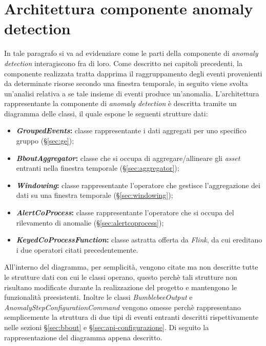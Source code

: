 

\section{Architettura componente anomaly detection}
In tale paragrafo si va ad evidenziare come le parti della componente di \textit{anomaly detection} interagiscono fra di loro. Come descritto nei capitoli precedenti, la componente realizzata tratta dapprima il raggruppamento degli eventi provenienti da determinate risorse secondo una finestra temporale, in seguito viene svolta un'analisi relativa a se tale insieme di eventi produce un'anomalia.
L'architettura rappresentante la componente di \textit{anomaly detection} è descritta tramite un \gls{diagramma delle classi}, il quale espone le seguenti strutture dati:
\begin{itemize}
	\item{\textbf{\textit{GroupedEvents}:} classe rappresentante i dati aggregati per uno specifico gruppo (\S\ref{sec:ge});}
	\item{\textbf{\textit{BboutAggregator}:} classe che si occupa di aggregare/allineare gli \textit{asset} entranti nella finestra temporale (\S\ref{sec:aggregator});}
	\item{\textbf{\textit{Windowing}:} classe rappresentante l'operatore che gestisce l'aggregazione dei dati su una finestra temporale (\S\ref{sec:windowing});}
	\item{\textbf{\textit{AlertCoProcess}:} classe rappresentante l'operatore che si occupa del rilevamento di anomalie (\S\ref{sec:alertcoprocess});}
	\item{\textbf{\textit{KeyedCoProcessFunction}:} classe astratta offerta da \textit{Flink}, da cui ereditano i due operatori citati precedentemente.}
\end{itemize}
All'interno del diagramma, per semplicità, vengono citate ma non descritte tutte le strutture dati con cui le classi operano, questo perchè tali strutture non risultano modificate durante la realizzazione del progetto e mantengono le funzionalità preesistenti. Inoltre le classi \textit{BumblebeeOutput} e \textit{AnomalyStepConfigurationCommand} vengono omesse perchè rappresentano semplicemente la struttura di due tipi di eventi entranti descritti rispettivamente nelle sezioni \S\ref{sec:bbout} e \S\ref{sec:api-configurazione}.
Di seguito la rappresentazione del diagramma appena descritto.

